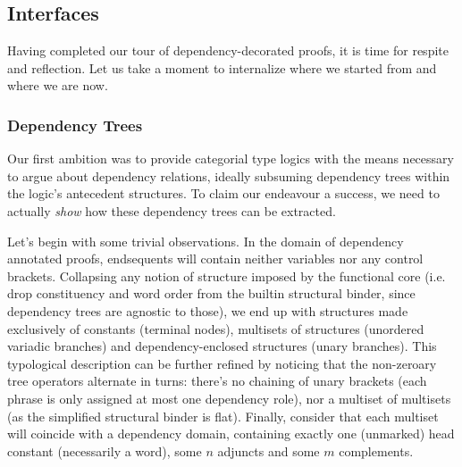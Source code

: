 \subsection{Interfaces}
Having completed our tour of dependency-decorated proofs, it is time for respite and reflection.
Let us take a moment to internalize where we started from and where we are now.

\subsubsection{Dependency Trees}
\label{subsubsection:dependency_trees}
Our first ambition was to provide categorial type logics with the means necessary to argue about dependency relations, ideally subsuming dependency trees within the logic's antecedent structures. 
To claim our endeavour a success, we need to actually \textit{show} how these dependency trees can be extracted.

Let's begin with some trivial observations.
In the domain of dependency annotated proofs, endsequents will contain neither variables nor any control brackets.
Collapsing any notion of structure imposed by the functional core (i.e. drop constituency and word order from the builtin structural binder, since dependency trees are agnostic to those), we end up with structures made exclusively of constants (terminal nodes), multisets of structures (unordered variadic branches) and dependency-enclosed structures (unary branches).
This typological description can be further refined by noticing that the non-zeroary tree operators alternate in turns: there's no chaining of unary brackets (each phrase is only assigned at most one dependency role), nor a multiset of multisets (as the simplified structural binder is flat).
Finally, consider that each multiset will coincide with a dependency domain, containing exactly one (unmarked) head constant (necessarily a word), some $n$ adjuncts and some $m$ complements.


